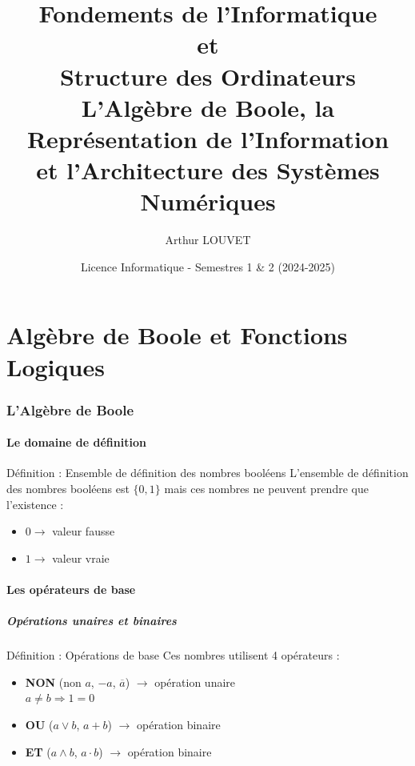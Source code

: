 \documentclass[a4paper,12pt]{article}
\title{\textbf{Fondements de l'Informatique \\ et \\ Structure des Ordinateurs} \\ 
\large L'Algèbre de Boole, la Représentation de l'Information \\ et l'Architecture des Systèmes Numériques}
\author{Arthur LOUVET}
\date{Licence Informatique - Semestres 1 \& 2 (2024-2025)}
\begin{document}
\maketitle
\thispagestyle{empty}

\newpage
\tableofcontents
\newpage


\part{Algèbre de Boole et Fonctions Logiques}

\section{L'Algèbre de Boole}

\subsection{Le domaine de définition}

\begin{defbox}{Définition : Ensemble de définition des nombres booléens}
L'ensemble de définition des nombres booléens est $\{0,1\}$ mais ces nombres ne peuvent prendre que l'existence : 
\begin{itemize}
    \item $0 \rightarrow$ valeur fausse
    \item $1 \rightarrow$ valeur vraie
\end{itemize}
\end{defbox}

\subsection{Les opérateurs de base}

\subsubsection{Opérations unaires et binaires}

\begin{defbox}{Définition : Opérations de base}
Ces nombres utilisent 4 opérateurs :
\begin{itemize}
    \item \textbf{NON} (non $a$, $-a$, $\overline{a}$) $\rightarrow$ opération unaire \\
    $a \neq b \Rightarrow 1 = 0$
    
    \item \textbf{OU} ($a \vee b$, $a + b$) $\rightarrow$ opération binaire
    
    \item \textbf{ET} ($a \wedge b$, $a \cdot b$) $\rightarrow$ opération binaire
\end{itemize}
\end{defbox}
\end{document}
